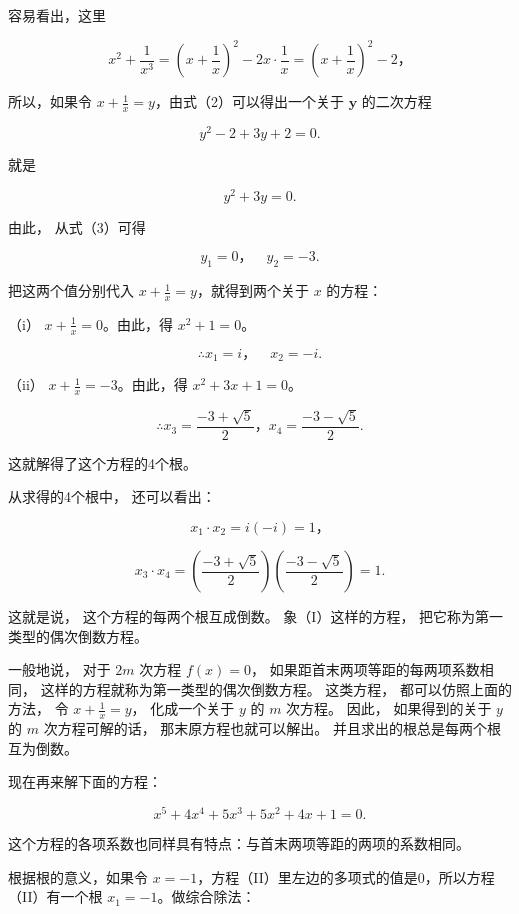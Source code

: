 容易看出，这里

\[
x ^ {2} + \frac {1}{x ^ {3}} = \left(x + \frac {1}{x}\right) ^ {2} - 2 x \cdot \frac {1}{x} = \left(x + \frac {1}{x}\right) ^ {2} - 2\text{，}
\]

所以，如果令 \(x + \frac{1}{x} = y\)，由式（2）可以得出一个关于
\(\pmb{y}\) 的二次方程

\[
y ^ {2} - 2 + 3 y + 2 = 0.
\]

就是

\[
y ^ {2} + 3 y = 0. \tag {3}
\]

由此， 从式（3）可得

\[
y _ {1} = 0\text{，} \quad y _ {2} = - 3.
\]

把这两个值分别代入 \(x + \frac{1}{x} = y\)，就得到两个关于 \(x\)
的方程：

（i） \(x + \frac{1}{x} = 0\)。由此，得 \(x^2 + 1 = 0\)。

\[
\therefore x _ {1} = i\text{，} \quad x _ {2} = - i.
\]

（ii） \(x + \frac{1}{x} = -3\)。由此，得 \(x^2 + 3x + 1 = 0\)。

\[
\therefore x _ {3} = \frac {- 3 + \sqrt {5}}{2}\text{，} x _ {4} = \frac {- 3 - \sqrt {5}}{2}.
\]

这就解得了这个方程的4个根。

从求得的4个根中， 还可以看出：

\[
x _ {1} \cdot x _ {2} = i (- i) = 1\text{，}
\]

\[
x _ {3} \cdot x _ {4} = \left(\frac {- 3 + \sqrt {5}}{2}\right) \left(\frac {- 3 - \sqrt {5}}{2}\right) = 1.
\]

这就是说， 这个方程的每两个根互成倒数。 象（I）这样的方程，
把它称为第一类型的偶次倒数方程。

一般地说， 对于 \(2m\) 次方程 \(f(x) = 0\)，
如果距首末两项等距的每两项系数相同，
这样的方程就称为第一类型的偶次倒数方程。 这类方程，
都可以仿照上面的方法， 令 \(x + \frac{1}{x} = y\)， 化成一个关于 \(y\)
的 \(m\) 次方程。 因此， 如果得到的关于 \(y\) 的 \(m\) 次方程可解的话，
那末原方程也就可以解出。 并且求出的根总是每两个根互为倒数。

现在再来解下面的方程：

\[
x ^ {5} + 4 x ^ {4} + 5 x ^ {3} + 5 x ^ {2} + 4 x + 1 = 0. \tag {II}
\]

这个方程的各项系数也同样具有特点：与首末两项等距的两项的系数相同。

根据根的意义，如果令
\(x = -1\)，方程（II）里左边的多项式的值是0，所以方程（II）有一个根
\(x_{1} = -1\)。做综合除法：

